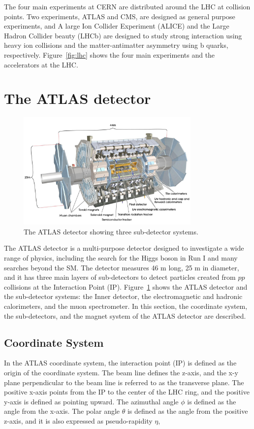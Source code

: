 The four main experiments at CERN are distributed around the LHC at collision points. Two experiments, ATLAS and CMS, are designed as general purpose experiments, and A large Ion Collider Experiment (ALICE) and the Large Hadron Collider beauty (LHCb) are designed to study strong interaction using heavy ion collisions and the matter-antimatter asymmetry using b quarks, respectively. Figure~\ref{fig:lhc} shows the four main experiments and the accelerators at the LHC.


\section{The ATLAS detector}
\label{sec:atlas:detector}

\begin{figure}[!htb]
    \includegraphics[width=0.8\textwidth]{figures/atlas.png}
    \centering
    \caption{The ATLAS detector showing three sub-detector systems.}
    \label{fig:atlas}
\end{figure}

The ATLAS detector is a multi-purpose detector designed to investigate a wide range of physics, including the search for the Higgs boson in Run I and many searches beyond the SM. The detector measures 46 m long, 25 m in diameter, and it has three main layers of sub-detectors to detect particles created from $pp$ collisions at the Interaction Point (IP). Figure~\ref{fig:atlas} shows the ATLAS detector and the sub-detector systems: the Inner detector, the electromagnetic and hadronic calorimeters, and the muon spectrometer. In this section, the coordinate system, the sub-detectors, and the magnet system of the ATLAS detector are described.

\subsection{Coordinate System}
\label{sec:atlas:coordinate}
In the ATLAS coordinate system, the interaction point (IP) is defined as the origin of the coordinate system. The beam line defines the z-axis, and the x-y plane perpendicular to the beam line is referred to as the transverse plane. The positive x-axis points from the IP to the center of the LHC ring, and the positive y-axis is defined as pointing upward. The azimuthal angle $\phi$ is defined as the angle from the x-axis. The polar angle $\theta$ is defined as the angle from the positive z-axis, and it is also expressed as pseudo-rapidity $\eta$,

